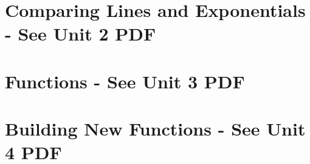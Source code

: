 \documentclass[handout]{xourse}
\begin{document}
\part{Comparing Lines and Exponentials - See Unit 2 PDF} 
%
%
%
%
%
%
%
%
%
%
%
%
\part{Functions - See Unit 3 PDF}
%
%
%
%
%
%
%
%
%
%
%
%
%
\part{Building New Functions - See Unit 4 PDF}
%
%
%
%
%
%
%
%
%
%
%
%
%
%
\end{document}
